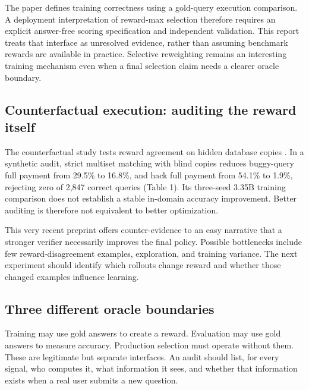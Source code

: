 \documentclass[11pt,a4paper]{article}
\begin{document}
The paper defines training correctness using a gold-query execution comparison. A deployment interpretation of reward-max selection therefore requires an explicit answer-free scoring specification and independent validation. This report treats that interface as unresolved evidence, rather than assuming benchmark rewards are available in practice. Selective reweighting remains an interesting training mechanism even when a final selection claim needs a clearer oracle boundary.

\subsection{Counterfactual execution: auditing the reward itself}
The counterfactual study tests reward agreement on hidden database copies \cite{counter}. In a synthetic audit, strict multiset matching with blind copies reduces buggy-query full payment from 29.5\% to 16.8\%, and hack full payment from 54.1\% to 1.9\%, rejecting zero of 2,847 correct queries (Table 1). Its three-seed 3.35B training comparison does not establish a stable in-domain accuracy improvement. Better auditing is therefore not equivalent to better optimization.

This very recent preprint offers counter-evidence to an easy narrative that a stronger verifier necessarily improves the final policy. Possible bottlenecks include few reward-disagreement examples, exploration, and training variance. The next experiment should identify which rollouts change reward and whether those changed examples influence learning.

\subsection{Three different oracle boundaries}
Training may use gold answers to create a reward. Evaluation may use gold answers to measure accuracy. Production selection must operate without them. These are legitimate but separate interfaces. An audit should list, for every signal, who computes it, what information it sees, and whether that information exists when a real user submits a new question.

\clearpage
\end{document}
